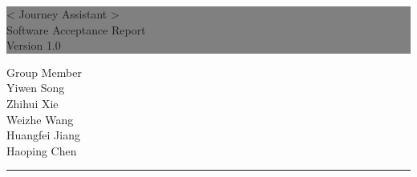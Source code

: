 \documentclass[10pt]{article}
\begin{document}

\begin{titlepage} %
	
	
	\colorbox{grey}{
		\parbox[t]{1.1\textwidth}{ %
			\parbox[t]{1.02\textwidth}{ %
				\raggedleft %
				\fontsize{34pt}{40pt}\selectfont %
				\vspace{0.7cm} %
				
				< Journey Assistant >\\
                Software Acceptance Report\\
                Version 1.0\\
				
				\vspace{0.7cm} %
			}
		}
	}
	
	\vfill %
	
	
	\parbox[t]{1\textwidth}{ %
		\raggedleft %
		\large %
		{\Large Group Member}\\[4pt] %
        Yiwen Song\\
        Zhihui Xie\\
        Weizhe Wang\\
        Huangfei Jiang\\
        Haoping Chen\\
		
		\hfill\rule{0.2\linewidth}{1pt}%
    }
    
	
\end{titlepage}
\end{document}
